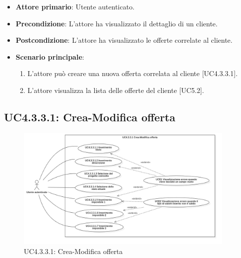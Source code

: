 \begin{itemize}
\item \textbf{Attore primario}: Utente autenticato.
\item \textbf{Precondizione}: L'attore ha visualizzato il dettaglio di un cliente.
\item \textbf{Postcondizione}: L'attore ha visualizzato le offerte correlate al cliente.
\item \textbf{Scenario principale}:
\begin{enumerate}
\item L'attore può creare una nuova offerta correlata al cliente [UC4.3.3.1].
\item L'attore visualizza la lista delle offerte del cliente [UC5.2].
\end{enumerate}
\end{itemize}

\pagebreak

\subsection{UC4.3.3.1: Crea-Modifica offerta}
\begin{figure}[!h]
\centering
\includegraphics[width=400px]{../images/UC/.jpeg/UC4.3.3.1-nuovaModificaOfferta.jpg}
\caption{UC4.3.3.1: Crea-Modifica offerta}
\end{figure}

